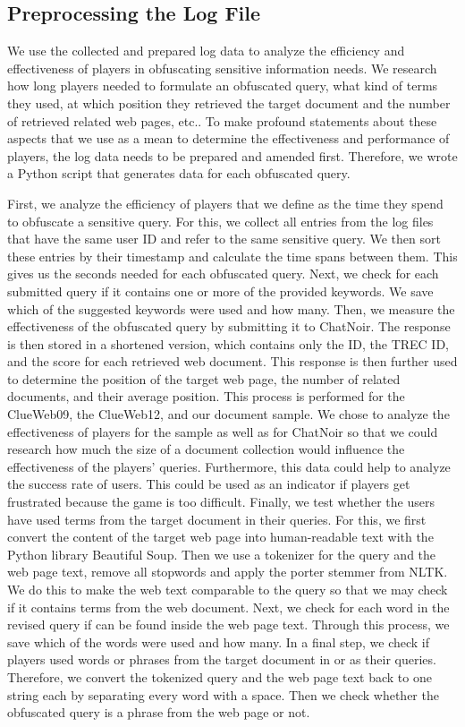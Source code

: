 \subsection{Preprocessing the Log File}
We use the collected and prepared log data to analyze the efficiency and effectiveness of players in obfuscating sensitive information needs. We research how long players needed to formulate an obfuscated query, what kind of terms they used, at which position they retrieved the target document and the number of retrieved related web pages, etc.. To make profound statements about these aspects that we use as a mean to determine the effectiveness and performance of players, the log data needs to be prepared and amended first. Therefore, we wrote a Python script that generates data for each obfuscated query.\par
First, we analyze the efficiency of players that we define as the time they spend to obfuscate a sensitive query. For this, we collect all entries from the log files that have the same user ID and refer to the same sensitive query. We then sort these entries by their timestamp and calculate the time spans between them. This gives us the seconds needed for each obfuscated query.
Next, we check for each submitted query if it contains one or more of the provided keywords. We save which of the suggested keywords were used and how many. Then, we measure the effectiveness of the obfuscated query by submitting it to ChatNoir. The response is then stored in a shortened version, which contains only the ID, the TREC ID, and the score for each retrieved web document. This response is then further used to determine the position of the target web page, the number of related documents, and their average position. This process is performed for the ClueWeb09, the ClueWeb12, and our document sample.
We chose to analyze the effectiveness of players for the sample as well as for ChatNoir so that we could research how much the size of a document collection would influence the effectiveness of the players' queries. Furthermore, this data could help to analyze the success rate of users. This could be used as an indicator if players get frustrated because the game is too difficult.
Finally, we test whether the users have used terms from the target document in their queries. For this, we first convert the content of the target web page into human-readable text with the Python library Beautiful Soup. Then we use a tokenizer for the query and the web page text, remove all stopwords and apply the porter stemmer from NLTK. We do this to make the web text comparable to the query so that we may check if it contains terms from the web document. Next, we check for each word in the revised query if can be found inside the web page text. Through this process, we save which of the words were used and how many. In a final step, we check if players used words or phrases from the target document in or as their queries. Therefore, we convert the tokenized query and the web page text back to one string each by separating every word with a space. Then we check whether the obfuscated query is a phrase from the web page or not.